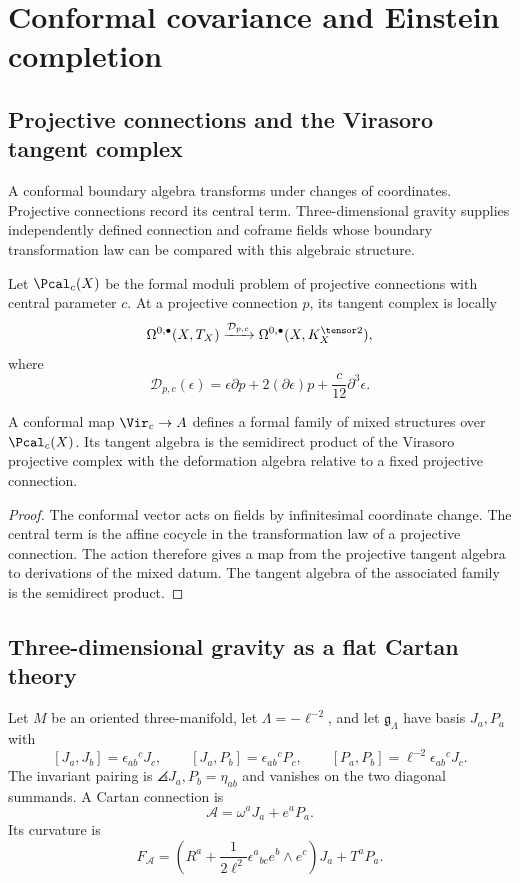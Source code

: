 \part{Conformal covariance and Einstein completion}


\chapter{Projective connections and the Virasoro tangent complex}
A conformal boundary algebra transforms under changes of coordinates. Projective connections record its central term. Three-dimensional gravity supplies independently defined connection and coframe fields whose boundary transformation law can be compared with this algebraic structure.

Let $\Pcal_c(X)$ be the formal moduli problem of projective connections with central parameter $c$.  At a projective connection $p$, its tangent complex is locally
\[
 \Omega^{0,\bullet}(X,T_X)
 \xrightarrow{\mathcal D_{p,c}}
 \Omega^{0,\bullet}(X,K_X^{\tensor2}),
\]
where
\[
 \mathcal D_{p,c}(\epsilon)
 =\epsilon\partial p+2(\partial\epsilon)p+\frac{c}{12}\partial^3\epsilon.
\]

\begin{theorem}
A conformal map $\Vir_c\to A$ defines a formal family of mixed structures over $\Pcal_c(X)$.  Its tangent algebra is the semidirect product of the Virasoro projective complex with the deformation algebra relative to a fixed projective connection.
\end{theorem}
\begin{proof}
The conformal vector acts on fields by infinitesimal coordinate change.  The central term is the affine cocycle in the transformation law of a projective connection.  The action therefore gives a map from the projective tangent algebra to derivations of the mixed datum.  The tangent algebra of the associated family is the semidirect product.
\end{proof}

\chapter{Three-dimensional gravity as a flat Cartan theory}
Let $M$ be an oriented three-manifold, let $\Lambda=-\ell^{-2}$, and let $\mathfrak g_\Lambda$ have basis $J_a,P_a$ with
\[
 [J_a,J_b]=\epsilon_{ab}{}^cJ_c,
 \qquad [J_a,P_b]=\epsilon_{ab}{}^cP_c,
 \qquad [P_a,P_b]=\ell^{-2}\epsilon_{ab}{}^cJ_c.
\]
The invariant pairing is $\angles{J_a,P_b}=\eta_{ab}$ and vanishes on the two diagonal summands.  A Cartan connection is
\[
 \mathcal A=\omega^aJ_a+e^aP_a.
\]
Its curvature is
\[
 F_{\mathcal A}
 =\left(R^a+\frac1{2\ell^2}\epsilon^a{}_{bc}e^b\wedge e^c\right)J_a
 +T^aP_a.
\]

